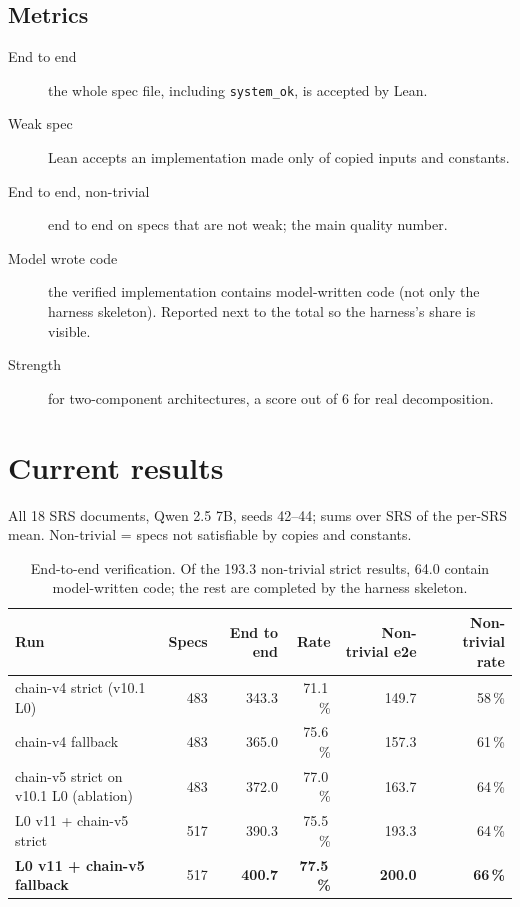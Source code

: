 \documentclass[11pt,a4paper]{article}
\newcommand{\code}[1]{\texttt{#1}}
\begin{document}
\subsection{Metrics}
\begin{description}
  \item[End to end] the whole spec file, including \code{system\_ok}, is accepted by Lean.
  \item[Weak spec] Lean accepts an implementation made only of copied inputs and constants.
  \item[End to end, non-trivial] end to end on specs that are not weak; the main quality number.
  \item[Model wrote code] the verified implementation contains model-written code (not only the
        harness skeleton). Reported next to the total so the harness's share is visible.
  \item[Strength] for two-component architectures, a score out of 6 for real decomposition.
\end{description}

\section{Current results}
\label{sec:results}

All 18 SRS documents, Qwen 2.5 7B, seeds 42--44; sums over SRS of the per-SRS mean.
Non-trivial = specs not satisfiable by copies and constants.

\begin{table}[h]
\centering
\small
\begin{tabular}{l r r r r r}
\toprule
Run & Specs & End to end & Rate & Non-trivial e2e & Non-trivial rate \\
\midrule
chain-v4 strict (v10.1 L0) & 483 & 343.3 & 71.1\,\% & 149.7 & 58\,\% \\
chain-v4 fallback & 483 & 365.0 & 75.6\,\% & 157.3 & 61\,\% \\
chain-v5 strict on v10.1 L0 (ablation) & 483 & 372.0 & 77.0\,\% & 163.7 & 64\,\% \\
L0 v11 + chain-v5 strict & 517 & 390.3 & 75.5\,\% & 193.3 & 64\,\% \\
\textbf{L0 v11 + chain-v5 fallback} & 517 & \textbf{400.7} & \textbf{77.5\,\%} & \textbf{200.0} & \textbf{66\,\%} \\
\bottomrule
\end{tabular}
\caption{End-to-end verification. Of the 193.3 non-trivial strict results, 64.0 contain model-written code; the rest are completed by the harness skeleton.}
\end{table}
\end{document}
